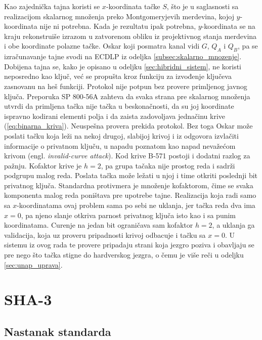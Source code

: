 Kao zajednička tajna koristi se $x$-koordinata tačke $S$, što je u saglasnosti sa realizacijom skalarnog množenja preko Montgomeryjevih merdevina, kojoj $y$-koordinata nije ni potrebna. Kada je rezultatu ipak potrebna, $y$-koordinata se na kraju rekonstruiše izrazom u zatvorenom obliku iz projektivnog stanja merdevina i obe koordinate polazne tačke. Oskar koji posmatra kanal vidi $G$, $Q_A$ i $Q_B$, pa se izračunavanje tajne svodi na ECDLP iz odeljka \ref{subsec:skalarno_mnozenje}. Dobijena tajna se, kako je opisano u odeljku \ref{sec:hibridni_sistem}, ne koristi neposredno kao ključ, već se propušta kroz funkciju za izvođenje ključeva zasnovanu na heš funkciji.
\smallbreak
Protokol nije potpun bez provere primljenog javnog ključa. Preporuka SP 800-56A \cite{sp80056a} zahteva da svaka strana pre skalarnog množenja utvrdi da primljena tačka nije tačka u beskonačnosti, da su joj koordinate ispravno kodirani elementi polja i da zaista zadovoljava jednačinu krive (\ref{eq:binarna_kriva}). Neuspešna provera prekida protokol. Bez toga Oskar može poslati tačku koja leži na nekoj drugoj, slabijoj krivoj i iz odgovora izvlačiti informacije o privatnom ključu, u napadu poznatom kao napad nevažećom krivom (engl. \textit{invalid-curve attack}).
\smallbreak
Kod krive B-571 postoji i dodatni razlog za pažnju. Kofaktor krive je $h = 2$, pa grupa tačaka nije prostog reda i sadrži podgrupu malog reda. Poslata tačka može ležati u njoj i time otkriti poslednji bit privatnog ključa. Standardna protivmera je množenje kofaktorom, čime se svaka komponenta malog reda poništava pre upotrebe tajne. Realizacija koja radi samo sa $x$-koordinatama ovaj problem sama po sebi ne uklanja, jer tačka reda dva ima $x = 0$, pa njeno slanje otkriva parnost privatnog ključa isto kao i sa punim koordinatama. Curenje na jedan bit ograničava sam kofaktor $h = 2$, a uklanja ga validacija, koja uz proveru pripadnosti krivoj odbacuje i tačku sa $x = 0$. U sistemu iz ovog rada te provere pripadaju strani koja jezgro poziva i obavljaju se pre nego što tačka stigne do hardverskog jezgra, o čemu je više reči u odeljku \ref{sec:unap_uprava}.

\section{SHA-3}
\label{sec:sha3}

\subsection{Nastanak standarda}
\label{subsec:sha3_istorijat}

